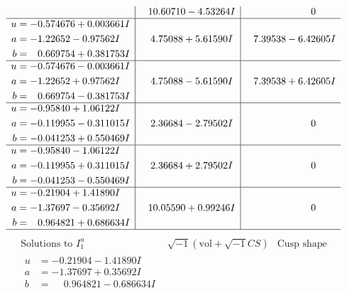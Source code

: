 \documentclass[1p]{elsarticle_modified}
\theoremstyle{definition}
\newcommand{\I}{\sqrt{-1}}
\begin{document}
$$\begin{array}{c|c|c}
 & \phantom{-}10.60710 - 4.53264 I & \phantom{-0.000000 } 0 \\ \hline\begin{aligned}
u &= -0.574676 + 0.003661 I \\
a &= -1.22652 - 0.97562 I \\
b &= \phantom{-}0.669754 + 0.381753 I\end{aligned}
 & \phantom{-}4.75088 + 5.61590 I & \phantom{-}7.39538 - 6.42605 I \\ \hline\begin{aligned}
u &= -0.574676 - 0.003661 I \\
a &= -1.22652 + 0.97562 I \\
b &= \phantom{-}0.669754 - 0.381753 I\end{aligned}
 & \phantom{-}4.75088 - 5.61590 I & \phantom{-}7.39538 + 6.42605 I \\ \hline\begin{aligned}
u &= -0.95840 + 1.06122 I \\
a &= -0.119955 - 0.311015 I \\
b &= -0.041253 + 0.550469 I\end{aligned}
 & \phantom{-}2.36684 - 2.79502 I & \phantom{-0.000000 } 0 \\ \hline\begin{aligned}
u &= -0.95840 - 1.06122 I \\
a &= -0.119955 + 0.311015 I \\
b &= -0.041253 - 0.550469 I\end{aligned}
 & \phantom{-}2.36684 + 2.79502 I & \phantom{-0.000000 } 0 \\ \hline\begin{aligned}
u &= -0.21904 + 1.41890 I \\
a &= -1.37697 - 0.35692 I \\
b &= \phantom{-}0.964821 + 0.686634 I\end{aligned}
 & \phantom{-}10.05590 + 0.99246 I & \phantom{-0.000000 } 0\\
 \hline 
 \end{array}$$\newpage$$\begin{array}{c|c|c}  
\text{Solutions to }I^u_{1}& \I (\text{vol} + \sqrt{-1}CS) & \text{Cusp shape}\\
 \hline 
\begin{aligned}
u &= -0.21904 - 1.41890 I \\
a &= -1.37697 + 0.35692 I \\
b &= \phantom{-}0.964821 - 0.686634 I\end{aligned}

\end{array}$$
\end{document}
